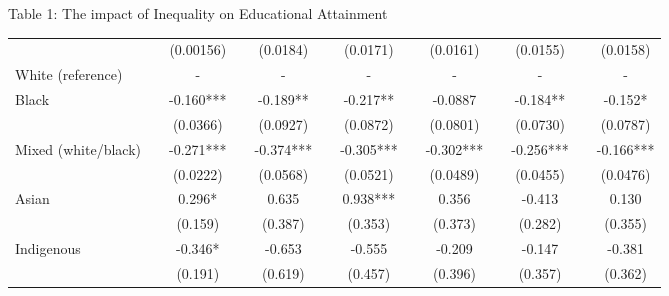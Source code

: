 \documentclass{beamer}
\begin{document}
\begin{frame}[label=main6]{\scriptsize Table 1: The impact of Inequality on Educational Attainment \hyperlink{Robustness}{\beamerbutton {\textcolor{red}{Robustness Checks}}}}
\begin{table}[htbp]
\begin{adjustbox}{max width=\textwidth}
\begin{tabular}{lllllllllllll}
          &       & \multicolumn{1}{c}{(0.00156)} &       & \multicolumn{1}{c}{(0.0184)} &       & \multicolumn{1}{c}{(0.0171)} &       & \multicolumn{1}{c}{(0.0161)} &       & \multicolumn{1}{c}{(0.0155)} &       & \multicolumn{1}{c}{(0.0158)} \\
    White (reference) &       & \multicolumn{1}{c}{-} &       & \multicolumn{1}{c}{-} &       & \multicolumn{1}{c}{-} &       & \multicolumn{1}{c}{-} &       & \multicolumn{1}{c}{-} &       & \multicolumn{1}{c}{-} \\
    Black &       & \multicolumn{1}{c}{-0.160***} &       & \multicolumn{1}{c}{-0.189**} &       & \multicolumn{1}{c}{-0.217**} &       & \multicolumn{1}{c}{-0.0887} &       & \multicolumn{1}{c}{-0.184**} &       & \multicolumn{1}{c}{-0.152*} \\
          &       & \multicolumn{1}{c}{(0.0366)} &       & \multicolumn{1}{c}{(0.0927)} &       & \multicolumn{1}{c}{(0.0872)} &       & \multicolumn{1}{c}{(0.0801)} &       & \multicolumn{1}{c}{(0.0730)} &       & \multicolumn{1}{c}{(0.0787)} \\
    Mixed (white/black) &       & \multicolumn{1}{c}{-0.271***} &       & \multicolumn{1}{c}{-0.374***} &       & \multicolumn{1}{c}{-0.305***} &       & \multicolumn{1}{c}{-0.302***} &       & \multicolumn{1}{c}{-0.256***} &       & \multicolumn{1}{c}{-0.166***} \\
          &       & \multicolumn{1}{c}{(0.0222)} &       & \multicolumn{1}{c}{(0.0568)} &       & \multicolumn{1}{c}{(0.0521)} &       & \multicolumn{1}{c}{(0.0489)} &       & \multicolumn{1}{c}{(0.0455)} &       & \multicolumn{1}{c}{(0.0476)} \\
    Asian &       & \multicolumn{1}{c}{0.296*} &       & \multicolumn{1}{c}{0.635} &       & \multicolumn{1}{c}{0.938***} &       & \multicolumn{1}{c}{0.356} &       & \multicolumn{1}{c}{-0.413} &       & \multicolumn{1}{c}{0.130} \\
          &       & \multicolumn{1}{c}{(0.159)} &       & \multicolumn{1}{c}{(0.387)} &       & \multicolumn{1}{c}{(0.353)} &       & \multicolumn{1}{c}{(0.373)} &       & \multicolumn{1}{c}{(0.282)} &       & \multicolumn{1}{c}{(0.355)} \\
    Indigenous &       & \multicolumn{1}{c}{-0.346*} &       & \multicolumn{1}{c}{-0.653} &       & \multicolumn{1}{c}{-0.555} &       & \multicolumn{1}{c}{-0.209} &       & \multicolumn{1}{c}{-0.147} &       & \multicolumn{1}{c}{-0.381} \\
          &       & \multicolumn{1}{c}{(0.191)} &       & \multicolumn{1}{c}{(0.619)} &       & \multicolumn{1}{c}{(0.457)} &       & \multicolumn{1}{c}{(0.396)} &       & \multicolumn{1}{c}{(0.357)} &       & \multicolumn{1}{c}{(0.362)} \\

\end{tabular}
\end{adjustbox}
\end{table}
\end{frame}
\end{document}

